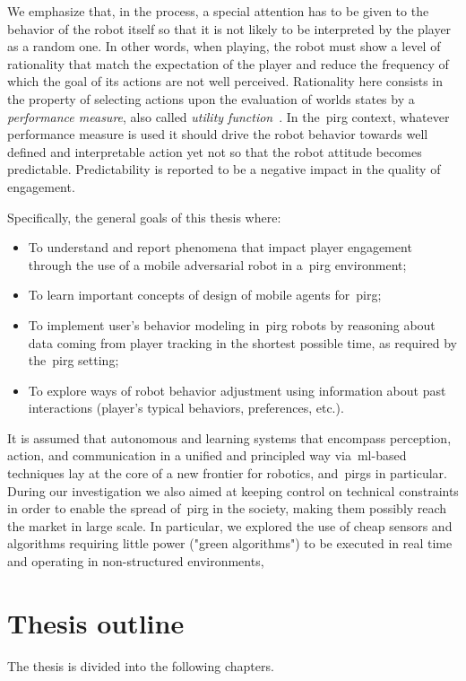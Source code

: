 We emphasize that, in the process, a special attention has to be given to the behavior of the robot itself so that it is not likely to be interpreted by the player as a random one. In other words, when playing, the robot must show a level of rationality that match the expectation of the player and reduce the frequency of which the goal of its actions are not well perceived. Rationality here consists in the property of selecting actions upon the evaluation of worlds states by a \textit{performance measure}, also called \textit{utility function}~\citep{russell_artificial_2009}. In the~\gls{pirg} context, whatever performance measure is used it should drive the robot behavior towards well defined and interpretable action yet not so that the robot attitude becomes predictable. Predictability is reported to be a negative impact in the quality of engagement.   

Specifically, the general goals of this thesis where:

\begin{itemize}
\item To understand and report phenomena that impact player engagement through the use of a mobile adversarial robot in a~\gls{pirg} environment;
\item To learn important concepts of design of mobile agents for~\gls{pirg};
\item To implement user's behavior modeling in~\gls{pirg} robots by reasoning about data coming from player tracking in the shortest possible time, as required by the~\gls{pirg} setting;
\item To explore ways of robot behavior adjustment using information about past interactions (player's typical behaviors, preferences, etc.).
\end{itemize}

It is assumed that autonomous and learning systems that encompass perception, action, and communication in a unified and principled way via~\gls{ml}-based techniques lay at the core of a new frontier for robotics, and~\gls{pirg}s in particular. During our investigation we also aimed at keeping control on technical constraints in order to enable the spread of~\gls{pirg} in the society, making them possibly reach the market in large scale. In particular, we explored the use of cheap sensors and algorithms requiring little power ("green algorithms") to be executed in real time and operating in non-structured environments, 

\section{Thesis outline}
The thesis is divided into the following chapters.

